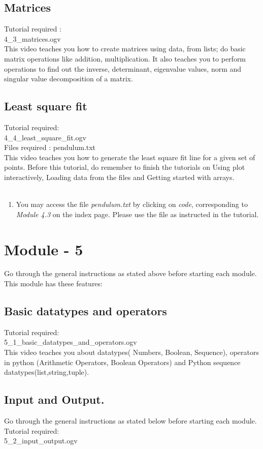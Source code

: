 \documentclass[11pt,twocolumn]{article}
\newenvironment{enumcpt}{\begin{enumerate} \topsep 0pt \partopsep 0pt 
                        \parsep 0pt
                        \itemsep 0pt \leftmargin -1in \rightmargin 0pt
                        }{\end{enumerate}}
\begin{document}
\subsection{Matrices}

Tutorial required : \\ 4\_3\_matrices.ogv \\
This video teaches you how to create matrices using data, from lists; do basic matrix operations like addition, multiplication. It also teaches you to perform operations to find out the inverse, determinant, eigenvalue values, norm and singular value decomposition of a matrix.
\subsection{Least square fit}
Tutorial required: \\ 4\_4\_least\_square\_fit.ogv \\
Files required : pendulum.txt \\
This video teaches you how to generate the least square fit line for a given set of points. Before this tutorial, do remember to finish the tutorials on Using plot interactively, Loading data from the files and Getting started with arrays. \\ \\
\begin{enumcpt}
\item You may access the file \emph{pendulum.txt}  by clicking on \emph{code}, corresponding to \emph{Module 4.3} on the index page. Please use the file as instructed in the tutorial. 
\end{enumcpt}

\section{Module - 5}
Go through the general instructions as stated above before starting each module.
This module has these features:
\subsection{Basic datatypes and operators}
Tutorial required: \\ 5\_1\_basic\_datatypes\_and\_operators.ogv \\
This video teaches you about datatypes( Numbers, Boolean, Sequence), operators in python (Arithmetic Operators, Boolean Operators) and Python sequence datatypes(list,string,tuple).

\subsection{Input and Output.}
Go through the general instructions as stated below before starting each module.
Tutorial required: \\ 5\_2\_input\_output.ogv \\
\end{document}
